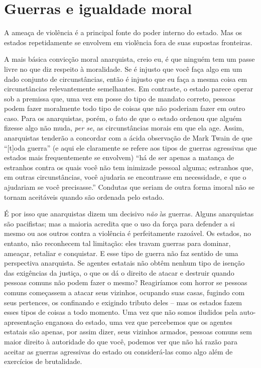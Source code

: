 \section{Guerras e igualdade moral}

A ameaça de violência é a principal fonte do poder interno do estado. Mas os estados repetidamente se envolvem em violência fora de suas supostas fronteiras.

A mais básica convicção moral anarquista, creio eu, é que ninguém tem um passe livre no que diz respeito à moralidade. Se é injusto que você faça algo em um dado conjunto de circunstâncias, então é injusto que eu faça a mesma coisa em circunstâncias relevantemente semelhantes. Em contraste, o estado parece operar sob a premissa que, uma vez em posse do tipo de mandato correto, pessoas podem fazer moralmente todo tipo de coisas que não poderiam fazer em outro caso. Para os anarquistas, porém, o fato de que o estado ordenou que alguém fizesse algo não muda, \emph{per se}, as circunstâncias morais em que ela age. Assim, anarquistas tenderão a concordar com a ácida observação de Mark Twain de que ``[t]oda guerra'' (e aqui ele claramente se refere aos tipos de guerras agressivas que estados mais frequentemente se envolvem) ``há de ser apenas a matança de estranhos contra os quais você não tem inimizade pessoal alguma; estranhos que, em outras circunstâncias, você ajudaria se encontrasse em necessidade, e que o ajudariam se você precisasse.'' Condutas que seriam de outra forma imoral não se tornam aceitáveis quando são ordenada pelo estado.

É por isso que anarquistas dizem um decisivo \emph{não} às guerras. Alguns anarquistas são pacifistas; mas a maioria acredita que o uso da força para defender a si mesmo ou aos outros contra a violência é perfeitamente razoável. Os estados, no entanto, não reconhecem tal limitação: eles travam guerras para dominar, ameaçar, retaliar e conquistar. E esse tipo de guerra não faz sentido de uma perspectiva anarquista. Se agentes estatais não obtêm nenhum tipo de isenção das exigências da justiça, o que os dá o direito de atacar e destruir quando pessoas comuns não podem fazer o mesmo? Reagiríamos com horror se pessoas comuns começassem a atacar seus vizinhos, ocupando suas casas, fugindo com seus pertences, os confinando e exigindo tributo deles -- mas os estados fazem esses tipos de coisas a todo momento. Uma vez que não somos iludidos pela auto-apresentação enganosa do estado, uma vez que percebemos que os agentes estatais são apenas, por assim dizer, seus vizinhos armados, pessoas comuns sem maior direito à autoridade do que você, podemos ver que não há razão para aceitar as guerras agressivas do estado ou considerá-las como algo além de exercícios de brutalidade.

